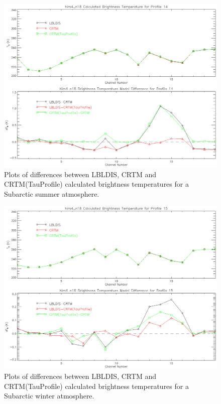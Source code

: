 \begin{figure}[htp]
  \centering{}
  \includegraphics[scale=0.8]{./graphics/Clear_Sky_Comparison_14.eps}
  \caption{Plots of differences between LBLDIS, CRTM and CRTM(TauProfile) calculated brightness temperatures for
   a Subarctic summer atmosphere.}
  \label{fig:Clear_Sky_Subarctic_summer}
\end{figure}

\begin{figure}[htp]
  \centering{}
  \includegraphics[scale=0.8]{./graphics/Clear_Sky_Comparison_15.eps}
  \caption{Plots of differences between LBLDIS, CRTM and CRTM(TauProfile) calculated brightness temperatures for
   a Subarctic winter atmosphere.}
  \label{fig:Clear_Sky_Subarctic_winter}
\end{figure}

